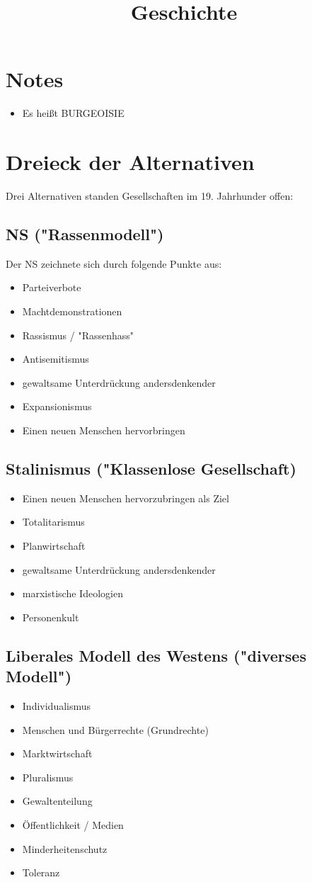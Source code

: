 \documentclass{article}
\title{Geschichte}
\begin{document}
\maketitle
\section*{Notes}
\begin{itemize}
    \item Es heißt BURGEOISIE
\end{itemize}
\section*{Dreieck der Alternativen}
Drei Alternativen standen Gesellschaften im 19. Jahrhunder offen:
\subsection*{NS ("Rassenmodell")}
Der NS zeichnete sich durch folgende Punkte aus:
\begin{itemize}
    \item Parteiverbote
    \item Machtdemonstrationen
    \item Rassismus / "Rassenhass"
    \item Antisemitismus
    \item gewaltsame Unterdrückung andersdenkender
    \item Expansionismus
    \item Einen neuen Menschen hervorbringen
\end{itemize}
\subsection*{Stalinismus ("Klassenlose Gesellschaft)}
\begin{itemize}
    \item Einen neuen Menschen hervorzubringen als Ziel
    \item Totalitarismus
    \item Planwirtschaft
    \item gewaltsame Unterdrückung andersdenkender
    \item marxistische Ideologien
    \item Personenkult
\end{itemize}
\subsection*{Liberales Modell des Westens ("diverses Modell")}
\begin{itemize}
    \item Individualismus
    \item Menschen und Bürgerrechte (Grundrechte)
    \item Marktwirtschaft
    \item Pluralismus
    \item Gewaltenteilung
    \item Öffentlichkeit / Medien 
    \item Minderheitenschutz
    \item Toleranz
\end{itemize}
\end{document}
